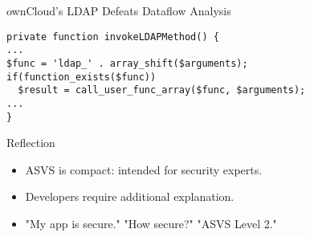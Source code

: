 \documentclass{beamer}
\begin{document}
\begin{frame}[fragile]{ownCloud's LDAP Defeats Dataflow Analysis}
\fontsize{10}{12.0}\selectfont


\begin{verbatim}
private function invokeLDAPMethod() {
...
$func = 'ldap_' . array_shift($arguments);
if(function_exists($func))
  $result = call_user_func_array($func, $arguments);
...
}
\end{verbatim}
\end{frame}


\begin{frame}{Reflection}



\begin{itemize}
\item ASVS is compact: intended for security experts.
\item Developers require additional explanation.
\item "My app is secure." "How secure?" "ASVS Level 2."
\end{itemize}
\end{frame}
\end{document}

